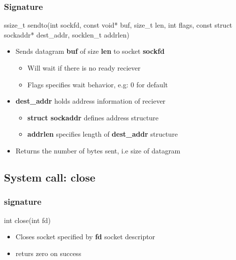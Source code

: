 \documentclass{report}
\begin{document}
    \subsubsection{Signature}
    \bigbreak \noindent 
    \begin{cppcode}
    ssize_t sendto(int sockfd, const void* buf, size_t len, int flags, const struct sockaddr* dest_addr, socklen_t addrlen)
    \end{cppcode}
    \bigbreak \noindent 
    \begin{itemize}
        \item Sends datagram \textbf{buf} of size \textbf{len} to socket \textbf{sockfd}
            \begin{itemize}
                \item Will wait if there is no ready reciever
                \item Flags specifies wait behavior, e.g: 0 for default
            \end{itemize}
        \item \textbf{dest\_addr} holds address information of reciever
            \begin{itemize}
                \item \textbf{struct sockaddr} defines address structure
                \item \textbf{addrlen} specifies length of \textbf{dest\_addr} structure
            \end{itemize}
        \item Returns the number of bytes sent, i.e size of datagram
    \end{itemize}

    \bigbreak \noindent 
    \subsection{System call: close}
    \bigbreak \noindent 
    \subsubsection{signature}
    \bigbreak \noindent 
    \begin{cppcode}
    int close(int fd)
    \end{cppcode}
    \bigbreak \noindent 
    \begin{itemize}
        \item Closes socket specified by \textbf{fd} socket descriptor
        \item returs zero on success
    \end{itemize}
\end{document}
